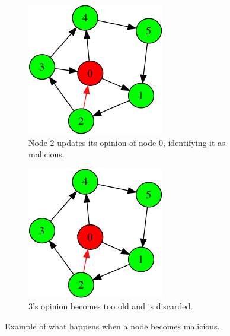 \begin{figure}
\vspace{1cm} %

\begin{subfigure}{0.3\textwidth}
\includegraphics[width=\linewidth]{images/rogue/2.png}
\caption{Node $2$ updates its opinion of node $0$, identifying it as malicious.} \label{fig:rogue2}
\end{subfigure}
\hspace*{1cm} %
\begin{subfigure}{0.3\textwidth}
\includegraphics[width=\linewidth]{images/rogue/3.png}
\caption{$3$'s opinion becomes too old and is discarded.} \label{fig:rogue3}
\end{subfigure}

\caption{Example of what happens when a node becomes malicious.}\label{fig:rogue}
\end{figure}

